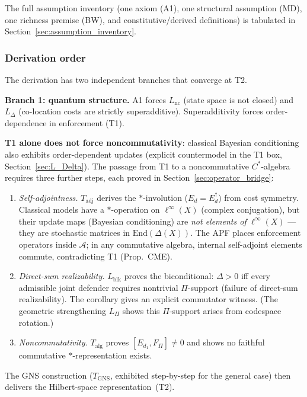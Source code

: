 \documentclass[11pt]{article}
\theoremstyle{remark}
\begin{document}
\smallskip\noindent The full assumption inventory (one axiom (A1), one structural assumption (MD), one richness premise (BW), and constitutive/derived definitions) is tabulated in Section~\ref{sec:assumption_inventory}.

\subsubsection*{Derivation order}

The derivation has two independent branches that converge at T2.

\medskip
\noindent\textbf{Branch 1: quantum structure.}\enspace{}
A1 forces $L_{\mathrm{nc}}$ (state space is not closed) and $L_\Delta$ (co-location costs are strictly superadditive).  Superadditivity forces order-dependence in enforcement (T1).

\textbf{T1 alone does not force noncommutativity}: classical Bayesian conditioning also exhibits order-dependent updates (explicit countermodel in the T1 box, Section~\ref{sec:L_Delta}).  The passage from T1 to a noncommutative $C^*$-algebra requires three further steps, each proved in Section~\ref{sec:operator_bridge}:
\begin{enumerate}[nosep,leftmargin=2em,itemsep=4pt]
\item \textit{Self-adjointness.}\enspace{} $T_{\mathrm{adj}}$ derives the $*$-involution ($E_d = E_d^\dagger$) from cost symmetry.  Classical models have a $*$-operation on $\ell^\infty(X)$ (complex conjugation), but their update maps (Bayesian conditioning) are \emph{not elements of} $\ell^\infty(X)$ --- they are stochastic matrices in $\mathrm{End}(\Delta(X))$.  The APF places enforcement operators inside $\mathcal{A}$; in any commutative algebra, internal self-adjoint elements commute, contradicting T1 (Prop.~CME).
\item \textit{Direct-sum realizability.}\enspace{} $L_{\mathrm{blk}}$ proves the biconditional: $\Delta > 0$ iff every admissible joint defender requires nontrivial $\Pi$-support (failure of direct-sum realizability).  The corollary gives an explicit commutator witness.  (The geometric strengthening $L_\Pi$ shows this $\Pi$-support arises from codespace rotation.)
\item \textit{Noncommutativity.}\enspace{} $T_{\mathrm{alg}}$ proves $[E_{d_1}, F_\Pi] \ne 0$ and shows no faithful commutative $*$-representation exists.
\end{enumerate}
The GNS construction ($T_{\mathrm{GNS}}$, exhibited step-by-step for the general case) then delivers the Hilbert-space representation~(T2).
\end{document}
